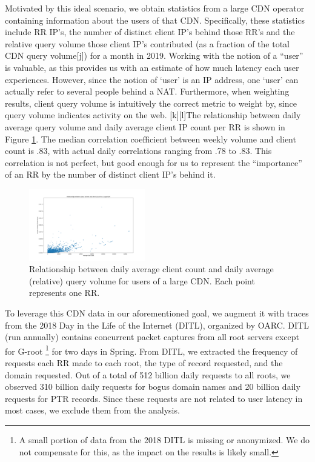\documentclass[sigconf,nonacm,10pt]{acmart}
\begin{document}
Motivated by this ideal scenario, we obtain statistics from a large CDN
operator containing information about the users of that CDN.
Specifically, these statistics include RR IP's, the number of distinct
client IP's behind those RR's and the relative query volume those client
IP's contributed (as a fraction of the total CDN query volume{[}j{]})
for a month in 2019. Working with the notion of a ``user'' is valuable,
as this provides us with an estimate of how much latency each user
experiences. However, since the notion of `user' is an IP address, one
`user' can actually refer to several people behind a NAT. Furthermore,
when weighting results, client query volume is intuitively the correct
metric to weight by, since query volume indicates activity on the web.
{[}k{]}{[}l{]}The relationship between daily average query volume and
daily average client IP count per RR is shown in Figure
\ref{fig:query_client_relationship}. The median correlation coefficient
between weekly volume and client count is .83, with actual daily
correlations ranging from .78 to .83. This correlation is not perfect,
but good enough for us to represent the ``importance'' of an RR by the
number of distinct client IP's behind it.

\begin{figure}
    \centering
    \includegraphics[width=0.45\textwidth]{figures/query_client_relationship.png}
    \caption{Relationship between daily average client count and daily average (relative) query volume for users of a large CDN. Each point represents one RR.}
    \label{fig:query_client_relationship}
\end{figure}

To leverage this CDN data in our aforementioned goal, we augment it with
traces from the 2018 Day in the Life of the Internet (DITL), organized
by OARC. DITL (run annually) contains concurrent packet captures from
all root servers except for G-root
\footnote{ A small portion of data from the 2018 DITL is missing or anonymized. We do not compensate for this, as the impact on the results is likely small. }
for two days in Spring. From DITL, we extracted the frequency of
requests each RR made to each root, the type of record requested, and
the domain requested. \break
Out of a total of 512 billion daily requests to all roots, we observed
310 billion daily requests for bogus domain names and 20 billion daily
requests for PTR records. Since these requests are not related to user
latency in most cases, we exclude them from the analysis.
\end{document}
